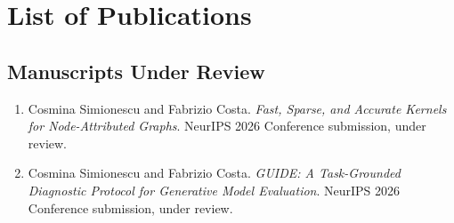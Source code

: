 \chapter*{List of Publications}

\section*{Manuscripts Under Review}

\begin{enumerate}
    \item Cosmina Simionescu and Fabrizio Costa.
    \textit{Fast, Sparse, and Accurate Kernels for Node-Attributed Graphs}.
    NeurIPS 2026 Conference submission, under review.

    \item Cosmina Simionescu and Fabrizio Costa.
    \textit{GUIDE: A Task-Grounded Diagnostic Protocol for Generative Model Evaluation}.
    NeurIPS 2026 Conference submission, under review.
\end{enumerate}
